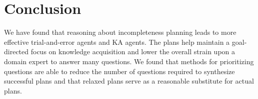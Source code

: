 \documentclass{article}
\def\citep#1{\cite{#1}}
\def\citet#1{\citeauthor{#1} (\citeyear{#1})}
\def\FFRISKY{{\tt DeFAULT}}
\renewcommand{\baselinestretch}{.98}
\begin{document}
% 
% 
% 
% 
% 


\section{Conclusion}

We have found that reasoning about incompleteness planning 
leads to more effective trial-and-error agents and KA agents.  The plans help maintain a
goal-directed focus on knowledge acquisition and lower the overall strain upon a
domain expert to answer many questions.  We found that methods for prioritizing
questions are able to reduce the number of questions required to synthesize
successful plans and that relaxed plans  serve as a reasonable substitute for
actual plans.  

\footnotesize
\renewcommand{\baselinestretch}{.75}

%
\end{document}
